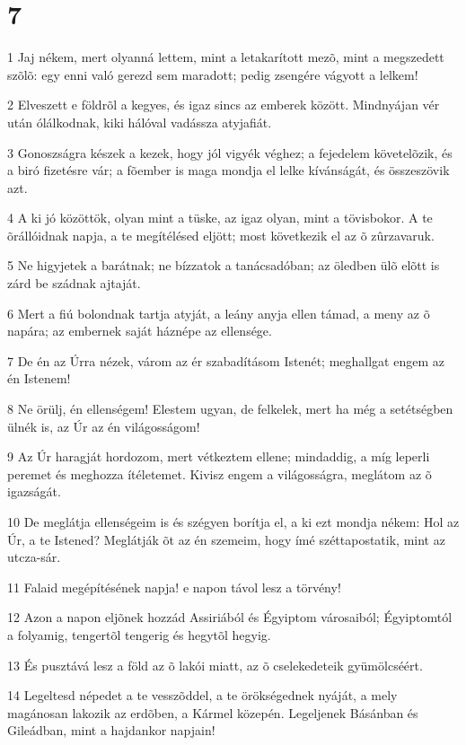 \chapter{7}

\par 1 Jaj nékem, mert olyanná lettem, mint a letakarított mezõ, mint a megszedett szõlõ: egy enni való gerezd sem maradott; pedig zsengére vágyott a lelkem!
\par 2 Elveszett e földrõl a kegyes, és igaz sincs az emberek között. Mindnyájan vér után ólálkodnak, kiki hálóval vadássza atyjafiát.
\par 3 Gonoszságra készek a kezek, hogy jól vigyék véghez; a fejedelem követelõzik, és a biró fizetésre vár; a fõember is maga mondja el lelke kívánságát, és összeszövik azt.
\par 4 A ki jó közöttök, olyan mint a tüske, az igaz olyan, mint a tövisbokor. A te õrállóidnak napja, a te megítélésed eljött; most következik el az õ zûrzavaruk.
\par 5 Ne higyjetek a barátnak; ne bízzatok a tanácsadóban; az öledben ülõ elõtt is zárd be szádnak ajtaját.
\par 6 Mert a fiú bolondnak tartja atyját, a leány anyja ellen támad, a meny az õ napára; az embernek saját háznépe az ellensége.
\par 7 De én az Úrra nézek, várom az ér szabadításom Istenét; meghallgat engem az én Istenem!
\par 8 Ne örülj, én ellenségem! Elestem ugyan, de felkelek, mert ha még a setétségben ülnék is, az Úr az én világosságom!
\par 9 Az Úr haragját hordozom, mert vétkeztem ellene; mindaddig, a míg leperli peremet és meghozza ítéletemet. Kivisz engem a világosságra, meglátom az õ igazságát.
\par 10 De meglátja ellenségeim is és szégyen borítja el, a ki ezt mondja nékem: Hol az Úr, a te Istened? Meglátják õt az én szemeim, hogy ímé széttapostatik, mint  az utcza-sár.
\par 11 Falaid megépítésének napja! e napon távol lesz a törvény!
\par 12 Azon a napon eljõnek hozzád Assiriából és Égyiptom városaiból; Égyiptomtól a folyamig, tengertõl tengerig és hegytõl hegyig.
\par 13 És pusztává lesz a föld az õ lakói miatt, az õ cselekedeteik gyümölcséért.
\par 14 Legeltesd népedet a te vesszõddel, a te örökségednek nyáját, a mely magánosan lakozik az erdõben, a Kármel közepén. Legeljenek Básánban és Gileádban, mint a hajdankor napjain!
